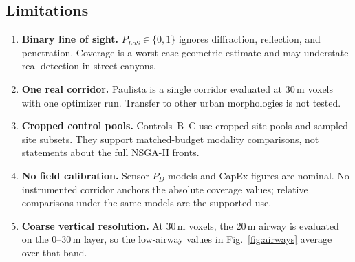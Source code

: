 \subsection{Limitations}
\label{sec:limitations}

\begin{enumerate}
\item \textbf{Binary line of sight.} \(P_{LoS}\in\{0,1\}\) ignores diffraction, reflection, and penetration. Coverage is a worst-case geometric estimate and may understate real detection in street canyons.
\item \textbf{One real corridor.} Paulista is a single corridor evaluated at 30\,m voxels with one optimizer run. Transfer to other urban morphologies is not tested.
\item \textbf{Cropped control pools.} Controls~B--C use cropped site pools and sampled site subsets. They support matched-budget modality comparisons, not statements about the full NSGA-II fronts.
\item \textbf{No field calibration.} Sensor \(P_D\) models and CapEx figures are nominal. No instrumented corridor anchors the absolute coverage values; relative comparisons under the same models are the supported use.
\item \textbf{Coarse vertical resolution.} At 30\,m voxels, the 20\,m airway is evaluated on the 0--30\,m layer, so the low-airway values in Fig.~\ref{fig:airways} average over that band.
\end{enumerate}
